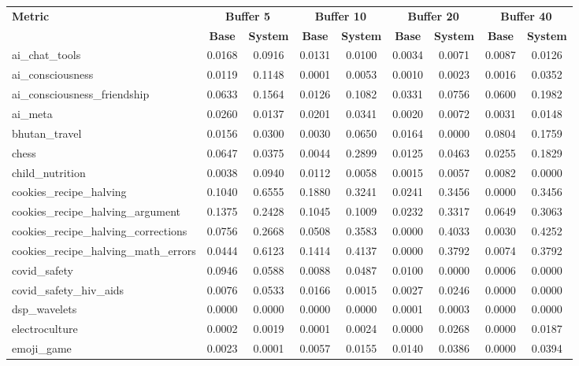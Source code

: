 \documentclass[pdflatex,sn-mathphys-num]{sn-jnl}%
\theoremstyle{thmstyleone}%
\theoremstyle{thmstyletwo}%
\theoremstyle{thmstylethree}%
\begin{document}
\begin{appendices}
\begin{landscape}
\begin{longtable}{@{}p{3.8cm}cccccccc@{}}
\toprule
\textbf{Metric} & \multicolumn{2}{c}{\textbf{Buffer 5}} & \multicolumn{2}{c}{\textbf{Buffer 10}} & \multicolumn{2}{c}{\textbf{Buffer 20}} & \multicolumn{2}{c}{\textbf{Buffer 40}} \\
\cmidrule(lr){2-3}\cmidrule(lr){4-5}\cmidrule(lr){6-7}\cmidrule(lr){8-9}
 & \textbf{Base} & \textbf{System} & \textbf{Base} & \textbf{System} & \textbf{Base} & \textbf{System} & \textbf{Base} & \textbf{System} \\
\midrule
\endhead
ai\_chat\_tools & 0.0168 & 0.0916 & 0.0131 & 0.0100 & 0.0034 & 0.0071 & 0.0087 & 0.0126 \\
ai\_consciousness & 0.0119 & 0.1148 & 0.0001 & 0.0053 & 0.0010 & 0.0023 & 0.0016 & 0.0352 \\
ai\_consciousness\_friendship & 0.0633 & 0.1564 & 0.0126 & 0.1082 & 0.0331 & 0.0756 & 0.0600 & 0.1982 \\
ai\_meta & 0.0260 & 0.0137 & 0.0201 & 0.0341 & 0.0020 & 0.0072 & 0.0031 & 0.0148 \\
bhutan\_travel & 0.0156 & 0.0300 & 0.0030 & 0.0650 & 0.0164 & 0.0000 & 0.0804 & 0.1759 \\
chess & 0.0647 & 0.0375 & 0.0044 & 0.2899 & 0.0125 & 0.0463 & 0.0255 & 0.1829 \\
child\_nutrition & 0.0038 & 0.0940 & 0.0112 & 0.0058 & 0.0015 & 0.0057 & 0.0082 & 0.0000 \\
cookies\_recipe\_halving & 0.1040 & 0.6555 & 0.1880 & 0.3241 & 0.0241 & 0.3456 & 0.0000 & 0.3456 \\
cookies\_recipe\_halving\_argument & 0.1375 & 0.2428 & 0.1045 & 0.1009 & 0.0232 & 0.3317 & 0.0649 & 0.3063 \\
cookies\_recipe\_halving\_corrections & 0.0756 & 0.2668 & 0.0508 & 0.3583 & 0.0000 & 0.4033 & 0.0030 & 0.4252 \\
cookies\_recipe\_halving\_math\_errors & 0.0444 & 0.6123 & 0.1414 & 0.4137 & 0.0000 & 0.3792 & 0.0074 & 0.3792 \\
covid\_safety & 0.0946 & 0.0588 & 0.0088 & 0.0487 & 0.0100 & 0.0000 & 0.0006 & 0.0000 \\
covid\_safety\_hiv\_aids & 0.0076 & 0.0533 & 0.0166 & 0.0015 & 0.0027 & 0.0246 & 0.0000 & 0.0000 \\
dsp\_wavelets & 0.0000 & 0.0000 & 0.0000 & 0.0000 & 0.0001 & 0.0003 & 0.0000 & 0.0000 \\
electroculture & 0.0002 & 0.0019 & 0.0001 & 0.0024 & 0.0000 & 0.0268 & 0.0000 & 0.0187 \\
emoji\_game & 0.0023 & 0.0001 & 0.0057 & 0.0155 & 0.0140 & 0.0386 & 0.0000 & 0.0394 \\

\end{longtable}
\end{landscape}
\end{appendices}
\end{document}
